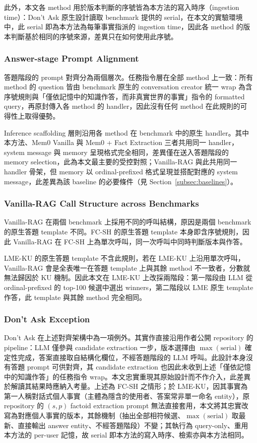 此外，本文各 method 用於版本判斷的序號皆為本方法的寫入時序（ingestion time）：Don't Ask 原生設計讀取 benchmark 提供的 serial，在本文的實驗環境中，此 serial 即為本方法為每筆事實指派的 ingestion time，因此各 method 的版本判斷基於相同的序號來源，差異只在如何使用此序號。
 
\subsubsection{Answer-stage Prompt Alignment}答題階段的 prompt 對齊分為兩個層次。任務指令層在全部 method 上一致：所有 method 的 question 皆由 benchmark 原生的 conversation creator 統一 wrap 為含序號規則與「僅依記憶中的知識作答，而非真實世界的事實」指令的 formatted query，再原封傳入各 method 的 handler，因此沒有任何 method 在此規則的可得性上取得優勢。
 
Inference scaffolding 層則沿用各 method 在 benchmark 中的原生 handler。其中本方法、Mem0 Vanilla 與 Mem0 + Fact Extraction 三者共用同一 handler，system message 與 memory 呈現格式完全相同，差異僅在送入答題階段的 memory selection，此為本文最主要的受控對照；Vanilla-RAG 與此共用同一 handler 骨架，但 memory 以 ordinal-prefixed 格式呈現並搭配對應的 system message，此差異為該 baseline 的必要條件（見 Section~\ref{subsec:baselines}）。
 
\subsubsection{Vanilla-RAG Call Structure across Benchmarks}Vanilla-RAG 在兩個 benchmark 上採用不同的呼叫結構，原因是兩個 benchmark 的原生答題 template 不同。FC-SH 的原生答題 template 本身即含序號規則，因此 Vanilla-RAG 在 FC-SH 上為單次呼叫，同一次呼叫中同時判斷版本與作答。
 
LME-KU 的原生答題 template 不含此規則，若在 LME-KU 上沿用單次呼叫，Vanilla-RAG 會是全表唯一在答題 template 上與其餘 method 不一致者，分數就無法歸因於 KU 機制。因此本文在 LME-KU 上改採兩階段：第一階段由 LLM 從 ordinal-prefixed 的 top-100 候選中選出 winners，第二階段以 LME 原生 template 作答，此 template 與其餘 method 完全相同。
 
\subsubsection{Don't Ask Exception}Don't Ask 在上述對齊架構中為一項例外。其實作直接沿用作者公開 repository 的 pipeline：LLM 僅參與 candidate extraction 一步，版本選擇由 $\max(\text{serial})$ 確定性完成，答案直接取自結構化欄位，不經答題階段的 LLM 呼叫。此設計本身沒有答題 prompt 可供對齊，其 candidate extraction 也因此未收到上述「僅依記憶中的知識作答」的任務指令 wrap。本文忠實重現其原始設計而不作介入，此差異於解讀其結果時應納入考量。上述為 FC-SH 之情形；於 LME-KU，因其事實為第一人稱對話式個人事實（主體為隱含的使用者、答案常非單一命名 entity），原 repository 的 $(s, p)$ factoid extraction prompt 無法直接套用，本文將其忠實改寫為對應個人事實的版本，其餘機制（抽出全部相符候選、$\max(\text{serial})$ 取最新、直接輸出 answer entity、不經答題階段）不變；其執行為 query-only、重用本方法的 per-user 記憶，故 serial 即本方法的寫入時序、檢索亦與本方法相同。
 
